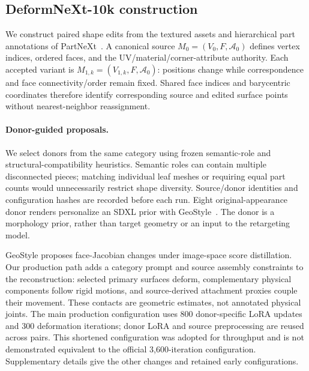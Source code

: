 \subsection{DeformNeXt-10k construction}
\label{sec:data-construction}
We construct paired shape edits from the textured assets and hierarchical
part annotations of PartNeXt~\cite{wang2025partnext}. A canonical source
$M_0=(V_0,F,\mathcal A_0)$ defines vertex indices, ordered faces, and the
UV/material/corner-attribute authority. Each accepted variant is
$M_{1,k}=(V_{1,k},F,\mathcal A_0)$: positions change while correspondence
and face connectivity/order remain fixed. Shared face indices and barycentric
coordinates therefore identify corresponding source and edited surface
points without nearest-neighbor reassignment.

\paragraph{Donor-guided proposals.}
We select donors from the same category using frozen semantic-role and
structural-compatibility heuristics. Semantic roles can contain multiple
disconnected pieces; matching individual leaf meshes or requiring equal
part counts would unnecessarily restrict shape diversity. Source/donor
identities and configuration hashes are recorded before each run. Eight
original-appearance donor renders personalize an SDXL prior with
GeoStyle~\cite{choi2026geostyle}. The donor is a morphology prior, rather
than target geometry or an input to the retargeting model.

GeoStyle proposes face-Jacobian changes under image-space score distillation.
Our production path adds a category prompt and source assembly constraints
to the reconstruction: selected primary surfaces deform, complementary
physical components follow rigid motions, and source-derived attachment
proxies couple their movement. These contacts are geometric estimates,
not annotated physical joints. The main production configuration uses
800 donor-specific LoRA updates and 300 deformation iterations; donor LoRA
and source preprocessing are reused across pairs. This shortened configuration
was adopted for throughput and is not demonstrated equivalent to the
official 3,600-iteration configuration. Supplementary details give the
other changes and retained early configurations.

